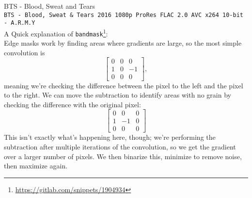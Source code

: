 \documentclass{scrartcl}
\begin{document}
BTS - Blood, Sweat and Tears\\
\texttt{BTS - Blood, Sweat \& Tears 2016 1080p ProRes FLAC 2.0 AVC x264 10-bit - A.R.M.Y}\\
A Quick explanation of \texttt{bandmask}\footnote{\url{https://gitlab.com/snippets/1904934}}:\\
Edge masks work by finding areas where gradients are large, so the most simple convolution is
\[
\begin{bmatrix}
0 & 0 & 0 \\
1 & 0 & -1 \\
0 & 0 & 0 
\end{bmatrix},
\]
meaning we're checking the difference between the pixel to the left and the pixel to the right.
We can move the subtraction to identify areas with no grain by checking the difference with the original pixel:
\[
\begin{bmatrix}
0 & 0 & 0 \\
1 & -1 & 0 \\
0 & 0 & 0
\end{bmatrix}
\]
This isn't exactly what's happening here, though; we're performing the subtraction after multiple iterations of the convolution, so we get the gradient over a larger number of pixels.  We then binarize this, minimize to remove noise, then maximize again.
\end{document}
